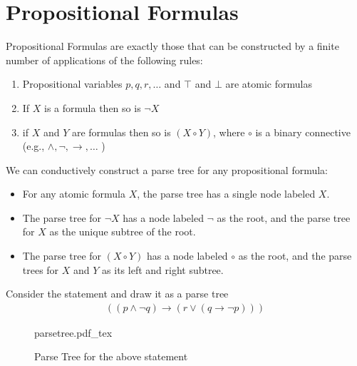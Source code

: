 \documentclass[a4paper]{article}
\newcommand{\incfig}[2][1]{%
    \def\svgwidth{#1\columnwidth}
    {#2.pdf_tex}
}
\theoremstyle{plain}
\theoremstyle{definition}
\newtheorem{defn}{Definition}[section]
\newtheorem{exmp}{Example}[section]
\theoremstyle{remark}
\begin{document}
	\section{Propositional Formulas}
	\begin{tcolorbox}[colback=black!3!white,colframe=black!60!white,title=\begin{defn}Propositional formulas \label{Propositional formulas}\end{defn}]
	Propositional Formulas are exactly those that can be constructed by a finite number of applications of the following rules:
	\begin{enumerate}
		\item Propositional variables $p,q,r,\ldots$ and $\top$ and $\bot$ are atomic formulas
		\item If $X$ is a formula then so is $\neg X$ 
		\item if $X$ and $Y$ are formulas then so is $(X \circ Y)$, where $\circ$ is a binary connective (e.g., $\land, \neg, \to ,\ldots$ )
	\end{enumerate}
	\end{tcolorbox}
	\begin{tcolorbox}[colback=black!3!white,colframe=black!60!white,title=\begin{defn}Parse Tree \label{Parse Tree}\end{defn}]
	We can conductively construct a parse tree for any propositional formula:
	\begin{itemize}
		\item For any atomic formula $X$, the parse tree has a single node labeled $X$.
		\item The parse tree for $\neg X$ has a node labeled $\neg$ as the root, and the parse tree for $X$ as the unique subtree of the root.
		\item The parse tree for $(X \circ Y)$ has a node labeled $\circ$ as the root, and the parse trees for $X$ and $Y$ as its left and right subtree.
	\end{itemize}
	\end{tcolorbox}
	\begin{tcolorbox}[colback=black!3!white,colframe=black!60!white,title=\begin{exmp}Parse Tree \label{Parse Tree}\end{exmp}]
Consider the statement and draw it as a parse tree
\begin{align}
	((p \land \neg q) \to (r \lor (q \to \neg p )))
\end{align}
\begin{figure}[H]
    \centering
    \incfig{parsetree}
    \caption{Parse Tree for the above statement}
    \label{fig:parsetree}
\end{figure}
\end{tcolorbox}
\end{document}
